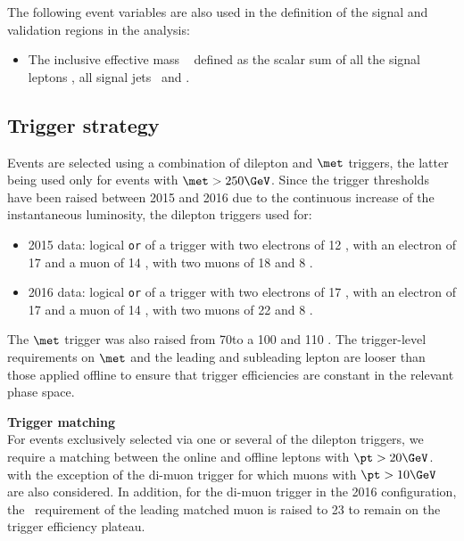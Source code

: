 The following event variables are also used in the definition of the signal and validation regions in the analysis:
\begin{itemize}
\item The inclusive effective mass \meff~ defined as the scalar sum of
  all the signal leptons \pt , all signal jets \pt\ and \met. 
\end{itemize}

\subsection{Trigger strategy}
\label{subsec:sec.strategy.sel.selection_trigger}
  
Events are selected using a combination of dilepton and $\met$ triggers, the latter being used only for events with $\met>250 \GeV$. 
Since the trigger thresholds have been raised between 2015 and 2016 due to the 
continuous increase of the instantaneous luminosity, 
the dilepton triggers used for: 
\begin{itemize}
\item 2015 data:
logical \texttt{or} of a trigger with two electrons of 12 \GeV, 
with an electron of 17 \GeV and a muon of 14 \GeV,
with two muons of 18 \GeV and 8 \GeV. 
\item 2016 data:
logical \texttt{or} of a trigger with two electrons of 17 \GeV, 
with an electron of 17 \GeV and a muon of 14 \GeV,
with two muons of 22 \GeV and 8 \GeV. 
\end{itemize}
The $\met$ trigger was also raised from 70\GeV to a 100 \GeV and 110 \GeV.
The trigger-level requirements on $\met$ and the leading and subleading lepton \pt are looser than those applied offline 
to ensure that trigger efficiencies are constant in the relevant phase space.


\par{\bfseries Trigger matching\\}
For events exclusively selected via one or several of the dilepton triggers, 
we require a matching between the online and offline leptons with $\pt>20 \GeV$.
with the exception of the di-muon trigger for which muons with $\pt>10 \GeV$ 
are also considered.
In addition, for the di-muon trigger in the 2016 configuration, 
the \pt\ requirement of the leading matched muon is raised to 23 \GeV 
to remain on the trigger efficiency plateau. 

